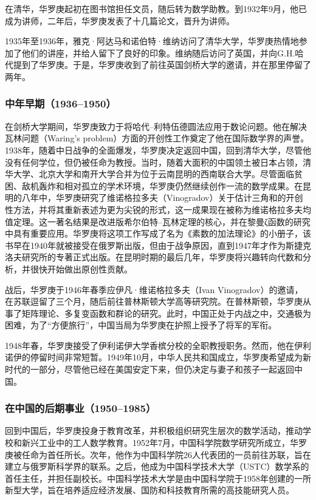 在清华，华罗庚起初在图书馆担任文员，随后转为数学助教。到1932年9月，他已成为讲师，二年后，华罗庚发表了十几篇论文，晋升为讲师。

1935年至1936年，雅克·阿达马和诺伯特·维纳访问了清华大学，华罗庚热情地参加了他们的讲座，并给人留下了良好的印象。维纳随后访问了英国，并向G.H.哈代提到了华罗庚。于是，华罗庚收到了前往英国剑桥大学的邀请，并在那里停留了两年。
\subsubsection{中年早期（1936–1950）}  
在剑桥大学期间，华罗庚致力于将哈代–利特伍德圆法应用于数论问题。他在解决瓦林问题（Waring's problem）方面的开创性工作奠定了他在国际数学界的声誉。1938年，随着中日战争的全面爆发，华罗庚决定返回中国，回到清华大学，尽管他没有任何学位，但仍被任命为教授。当时，随着大面积的中国领土被日本占领，清华大学、北京大学和南开大学合并为位于云南昆明的西南联合大学。尽管面临贫困、敌机轰炸和相对孤立的学术环境，华罗庚仍然继续创作一流的数学成果。在昆明的八年中，华罗庚研究了维诺格拉多夫（Vinogradov）关于估计三角和的开创性方法，并将其重新表述为更为尖锐的形式，这一成果现在被称为维诺格拉多夫均值定理。这一著名结果是改进版希尔伯特–瓦林定理的核心，并在黎曼ζ函数的研究中具有重要应用。华罗庚将这项工作写成了名为《素数的加法理论》的小册子，该书早在1940年就被接受在俄罗斯出版，但由于战争原因，直到1947年才作为斯捷克洛夫研究所的专著正式出版。在昆明时期的最后几年，华罗庚将兴趣转向代数和分析，并很快开始做出原创性贡献。

战后，华罗庚于1946年春季应伊凡·维诺格拉多夫（Ivan Vinogradov）的邀请，在苏联逗留了三个月，随后前往普林斯顿大学高等研究院。在普林斯顿，华罗庚从事了矩阵理论、多复变函数和群论的研究。此时，中国正处于内战之中，交通极为困难，为了“方便旅行”，中国当局为华罗庚在护照上授予了将军的军衔。

1948年春，华罗庚接受了伊利诺伊大学香槟分校的全职教授职务。然而，他在伊利诺伊的停留时间非常短暂。1949年10月，中华人民共和国成立，华罗庚希望成为新时代的一部分，尽管他已经在美国安定下来，但仍决定与妻子和孩子一起返回中国。
\subsubsection{在中国的后期事业（1950–1985）}  
回到中国后，华罗庚投身于教育改革，并积极组织研究生层次的数学活动，推动学校和新兴工业中的工人数学教育。1952年7月，中国科学院数学研究所成立，华罗庚被任命为首任所长。次年，他作为中国科学院26人代表团的一员前往苏联，旨在建立与俄罗斯科学界的联系。之后，他成为中国科学技术大学（USTC）数学系的首任主任，并担任副校长。中国科学技术大学是由中国科学院于1958年创建的一所新型大学，旨在培养适应经济发展、国防和科技教育所需的高技能研究人员。


